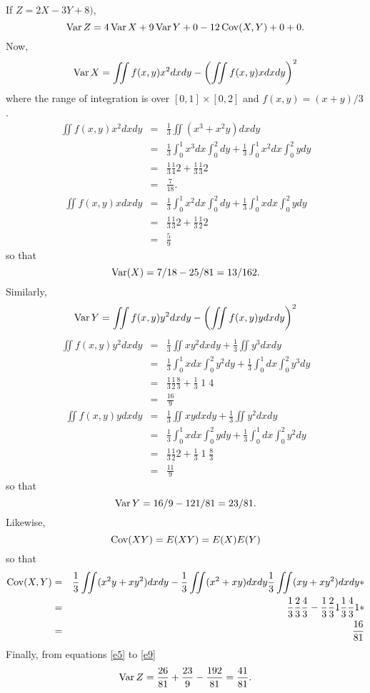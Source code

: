 \documentclass{article}
\begin{document}
\begin{enumerate}
If $Z = 2X - 3Y + 8)$, 
\begin{equation}\label{e6}
\operatorname{Var}{Z} = 4\operatorname{Var}{X} + 9\operatorname{Var}{Y} + 0 - 12\operatorname{Cov}(X, Y)+0+0.
\end{equation}
Now,
\[
\operatorname{Var}{X} = \iint f(x, y)x^2dxdy - \left(\iint f(x, y)xdxdy\right)^2
\]
where the range of integration is over $[0, 1] \times [0, 2]$ and $f(x, y) = 
(x + y)/3$.
\begin{eqnarray*}
\iint f(x, y)x^2dxdy &=& \frac{1}{3}\iint(x^3 + x^2y)dxdy \\
 &=& \frac{1}{3}\int_0^1x^3dx\int_0^2 dy + \frac{1}{3}\int_0^1x^2dx\int_0^2ydy \\
 &=& \frac{1}{3}\frac{1}{4}2 + \frac{1}{3}\frac{1}{3}2 \\
 &=& \frac{7}{18}.
\end{eqnarray*}
\begin{eqnarray*}
\iint f(x, y)xdxdy &=& \frac{1}{3}\int_0^1x^2dx\int_0^2dy + 
 \frac{1}{3}\int_0^1xdx\int_0^2ydy \\
 &=& \frac{1}{3}\frac{1}{3}2 + \frac{1}{3}\frac{1}{2}2 \\
 &=& \frac{5}{9}
\end{eqnarray*}
so that 
\begin{equation}\label{e7}
\operatorname{Var}(X) = 7/18 - 25/81 = 13/162.
\end{equation}
Similarly,
\[
\operatorname{Var}{Y} = \iint f(x, y)y^2dxdy - \left(\iint f(x, y)ydxdy\right)^2
\]
\begin{eqnarray*}
\iint f(x, y)y^2dxdy &=& \frac{1}{3}\iint xy^2dxdy + \frac{1}{3}\iint y^3dxdy \\
 &=& \frac{1}{3}\int_0^1xdx\int_0^2y^2dy + \frac{1}{3}\int_0^1dx\int_0^2y^3dy \\
 &=& \frac{1}{3}\frac{1}{2}\frac{8}{3} + \frac{1}{3}\;1\;4 \\
 &=& \frac{16}{9}
\end{eqnarray*}
\begin{eqnarray*}
\iint f(x, y)ydxdy &=& \frac{1}{3}\iint xydxdy + \frac{1}{3}\iint y^2dxdy \\
 &=& \frac{1}{3}\int_0^1xdx\int_0^2ydy + \frac{1}{3}\int_0^1dx\int_0^2y^2dy \\
 &=& \frac{1}{3}\frac{1}{2}2 + \frac{1}{3}\;1\;\frac{8}{3} \\
 &=& \frac{11}{9}
\end{eqnarray*}
so that 
\begin{equation}\label{e8}
\operatorname{Var} Y = 16/9 - 121/81 = 23/81.
\end{equation}
Likewise,
\[
\operatorname{Cov}(XY) = E(XY) = E(X)E(Y)
\]
so that
\begin{eqnarray}
\operatorname{Cov}(X,Y) &=& \frac{1}{3}\iint (x^2y + xy^2)dxdy - \frac{1}{3}\iint(x^2+xy)dxdy
\frac{1}{3}\iint(xy + xy^2)dxdy \nonumber* \\
 &=& \frac{1}{3}\frac{2}{3}\frac{4}{3} - \frac{1}{3}\frac{2}{3}1
 \frac{1}{3}\frac{4}{3}1 \nonumber* \\
 &=& \frac{16}{81} \label{e9}
\end{eqnarray}
Finally, from equations \eqref{e5} to \eqref{e9}
\[
\operatorname{Var} Z = \frac{26}{81} + \frac{23}{9} - \frac{192}{81} = \frac{41}{81}.
\]
\end{enumerate}
 
\end{document}
